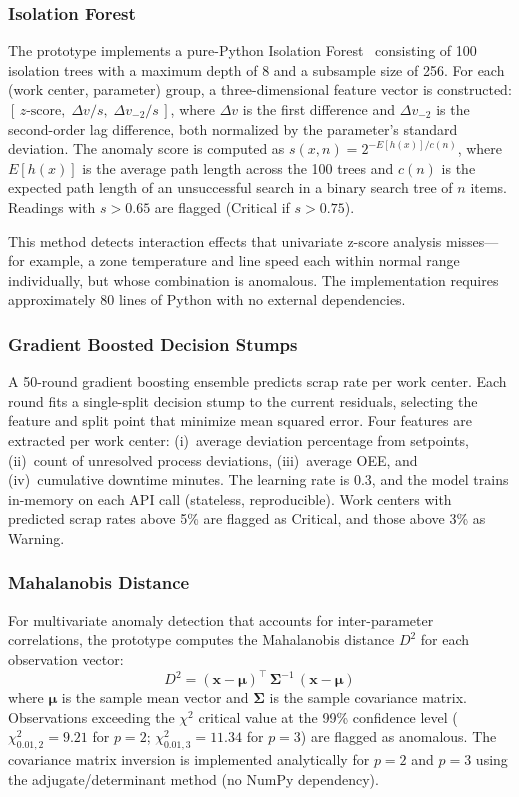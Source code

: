 \documentclass[11pt]{article}
\begin{document}
\subsubsection{Isolation Forest}

The prototype implements a pure-Python Isolation Forest~\cite{liu2017} consisting of 100 isolation trees with a maximum depth of 8 and a subsample size of 256.  For each (work center, parameter) group, a three-dimensional feature vector is constructed: $[\,z\text{-score},\;\Delta v / s,\;\Delta v_{-2} / s\,]$, where $\Delta v$ is the first difference and $\Delta v_{-2}$ is the second-order lag difference, both normalized by the parameter's standard deviation.  The anomaly score is computed as $s(x, n) = 2^{-E[h(x)]/c(n)}$, where $E[h(x)]$ is the average path length across the 100 trees and $c(n)$ is the expected path length of an unsuccessful search in a binary search tree of $n$ items.  Readings with $s > 0.65$ are flagged (Critical if $s > 0.75$).

This method detects interaction effects that univariate z-score analysis misses---for example, a zone temperature and line speed each within normal range individually, but whose combination is anomalous.  The implementation requires approximately 80 lines of Python with no external dependencies.

\subsubsection{Gradient Boosted Decision Stumps}

A 50-round gradient boosting ensemble predicts scrap rate per work center.  Each round fits a single-split decision stump to the current residuals, selecting the feature and split point that minimize mean squared error.  Four features are extracted per work center: (i)~average deviation percentage from setpoints, (ii)~count of unresolved process deviations, (iii)~average OEE, and (iv)~cumulative downtime minutes.  The learning rate is 0.3, and the model trains in-memory on each API call (stateless, reproducible).  Work centers with predicted scrap rates above 5\% are flagged as Critical, and those above 3\% as Warning.

\subsubsection{Mahalanobis Distance}

For multivariate anomaly detection that accounts for inter-parameter correlations, the prototype computes the Mahalanobis distance $D^2$ for each observation vector:
\[
D^2 = (\mathbf{x} - \boldsymbol{\mu})^\top \, \boldsymbol{\Sigma}^{-1} \, (\mathbf{x} - \boldsymbol{\mu})
\]
where $\boldsymbol{\mu}$ is the sample mean vector and $\boldsymbol{\Sigma}$ is the sample covariance matrix.  Observations exceeding the $\chi^2$ critical value at the 99\% confidence level ($\chi^2_{0.01,2} = 9.21$ for $p=2$; $\chi^2_{0.01,3} = 11.34$ for $p=3$) are flagged as anomalous.  The covariance matrix inversion is implemented analytically for $p = 2$ and $p = 3$ using the adjugate/determinant method (no NumPy dependency).
\end{document}
